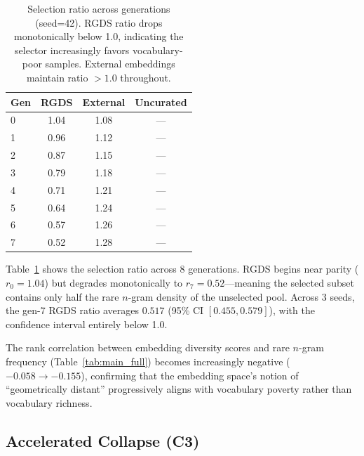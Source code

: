 \documentclass[11pt,a4paper]{article}
\begin{document}
\begin{table}[t]
\centering
\small
\begin{tabular}{lccc}
\toprule
\textbf{Gen} & \textbf{RGDS} & \textbf{External} & \textbf{Uncurated} \\
\midrule
0 & 1.04 & 1.08 & --- \\
1 & 0.96 & 1.12 & --- \\
2 & 0.87 & 1.15 & --- \\
3 & 0.79 & 1.18 & --- \\
4 & 0.71 & 1.21 & --- \\
5 & 0.64 & 1.24 & --- \\
6 & 0.57 & 1.26 & --- \\
7 & 0.52 & 1.28 & --- \\
\bottomrule
\end{tabular}
\caption{Selection ratio across generations (seed=42). RGDS ratio drops monotonically below 1.0, indicating the selector increasingly favors vocabulary-poor samples. External embeddings maintain ratio $>1.0$ throughout.}
\label{tab:sel_ratio}
\end{table}

Table~\ref{tab:sel_ratio} shows the selection ratio across 8 generations.
RGDS begins near parity ($r_0 = 1.04$) but degrades monotonically to $r_7 = 0.52$---meaning the selected subset contains only half the rare $n$-gram density of the unselected pool.
Across 3 seeds, the gen-7 RGDS ratio averages $0.517$ (95\% CI $[0.455, 0.579]$), with the confidence interval entirely below 1.0.

The rank correlation between embedding diversity scores and rare $n$-gram frequency (Table~\ref{tab:main_full}) becomes increasingly negative ($-0.058 \to -0.155$), confirming that the embedding space's notion of ``geometrically distant'' progressively aligns with vocabulary poverty rather than vocabulary richness.

\subsection{Accelerated Collapse (C3)}
\end{document}
